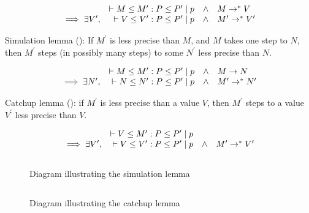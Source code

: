 \newcommand\wwedge{\quad\wedge\quad}

\[
\begin{array}{rrcl}
  & \TermP{}{M}{P}{M^\prime}{P^\prime}{p} & \wedge & M \stepsto V
\\ \implies \exists V^\prime , & \TermP{}{V}{P}{V^\prime}{P^\prime}{p} & \wedge & M^\prime \stepsto V^\prime
\end{array}
\]

Simulation lemma (): If $M^\prime$ is less precise than $M$, and $M$ takes one step to $N$,
then $M^\prime$ steps (in possibly many steps) to some $N^\prime$ less precise than $N$.

\[
\begin{array}{rrcl}
  & \TermP{}{M}{P}{M^\prime}{P^\prime}{p} & \wedge & M \stepto N
\\ \implies \exists N^\prime , & \TermP{}{N}{P}{N^\prime}{P^\prime}{p} & \wedge & M^\prime \stepsto N^\prime
\end{array}
\]

Catchup lemma (): if $M^\prime$ is less precise than a value $V$, then $M^\prime$ steps
to a value $V^\prime$ less precise than $V$.

\[
\begin{array}{rrcl}
  & \TermP{}{V}{P}{M^\prime}{P^\prime}{p} & &
\\ \implies \exists V^\prime , & \TermP{}{V}{P}{V^\prime}{P^\prime}{p} & \wedge & M^\prime \stepsto V^\prime
\end{array}
\]

\begin{figure}
$$

$$
\caption{Diagram illustrating the simulation lemma}
\label{fig:sim}
\end{figure}

\begin{figure}
$$  $$
\caption{Diagram illustrating the catchup lemma}
\label{fig:catchup}
\end{figure}
